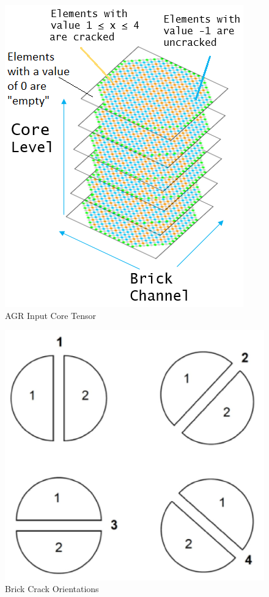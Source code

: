 \begin{figure}[ht!]
	\centering
	\includegraphics[scale=0.5]{Figures/cracked_core_array.png}
	\caption{AGR Input Core Tensor}
	\label{fig:core_array}
\end{figure}

\begin{figure}[ht!]
	\centering
	\includegraphics[scale=0.1]{Figures/orientations}
	\caption{Brick Crack Orientations}
	\label{fig:orientations}
\end{figure}

